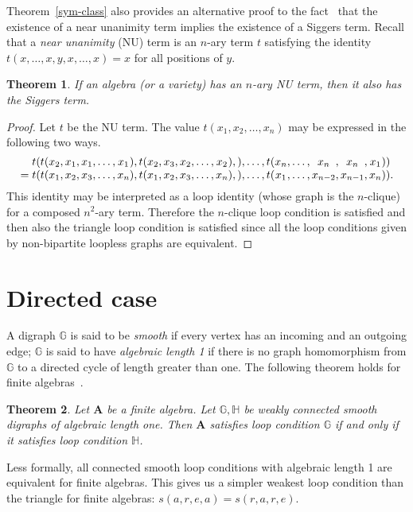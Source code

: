 \documentclass[a4paper]{article}
\newcommand{\alg}[1]{\mathbf{#1}}
\newcommand{\relstr}[1]{\mathbb{#1}}
\newtheorem{theorem}{Theorem}
\begin{document}
Theorem~\ref{sym-class} also provides an alternative proof to the fact~\cite{Olsak} that the existence of a near unanimity
term implies the existence of a Siggers term. Recall that a \emph{near unanimity} (NU) term is an $n$-ary term $t$ satisfying the identity
$t(x,\ldots,x,y,x,\ldots,x)= x$ for all positions of $y$.

\begin{theorem}
  If an algebra (or a variety) has an $n$-ary NU term, then it also has the Siggers term.
\end{theorem}
\begin{proof}
  Let $t$ be the NU term. The value $t(x_1, x_2, \ldots, x_n)$ may be
  expressed in the following two ways.
  \[
  \vbox{\def\c#1{\hfil#1\hfil}
  \halign{$#{}$&$t(t(\c{#},{}$&$\c{#},{}$&$\c{#},\ldots,{}$&$\c{#}),{}$&%
                  $t(\c{#},{}$&$\c{#},{}$&$\c{#},\ldots,{}$&$\c{#}),{}$&%
       $),\ldots,{}t(\c{#},\ldots,{}$&$\c{#},{}$&$\c{#},{}$&$\c{#}))$&${}#$\cr
 &x_2&x_1&x_1&x_1&  x_2&x_3&x_2&x_2&   x_n&  x_n   &  x_n  &x_1&\cr
=&x_1&x_2&x_3&x_n&  x_1&x_2&x_3&x_n&   x_1&x_{n-2}&x_{n-1}&x_n&.\hss\cr
  }}
  \]
  This identity may be interpreted as a loop identity (whose graph is the $n$-clique) for a composed $n^2$-ary term.
  Therefore the $n$-clique loop condition is satisfied and then also the
  triangle loop condition is satisfied since all the loop conditions given by non-bipartite loopless graphs are equivalent.  
\end{proof}

\section{Directed case}

A digraph $\relstr G$ is said to be {\it smooth\/} if every vertex has an incoming
and an outgoing edge; $\relstr G$ is said to have
{\it algebraic length 1} if there is no graph homomorphism from
$\relstr G$ to a directed cycle of length greater than one.
The following theorem holds for finite algebras~\cite{OptimalStrong}.

\begin{theorem}
  Let $\alg A$ be a finite algebra. Let $\relstr G, \relstr H$ be weakly connected smooth
  digraphs of algebraic length one. Then $\alg A$ satisfies loop
  condition $\relstr G$  if and only if it satisfies loop condition  $\relstr H$.
\end{theorem}

Less formally, all connected smooth loop conditions with algebraic length
1 are equivalent for finite algebras. This gives us a simpler weakest loop
condition than the triangle for finite algebras: $s(a,r,e,a)=s(r,a,r,e)$.
\end{document}
